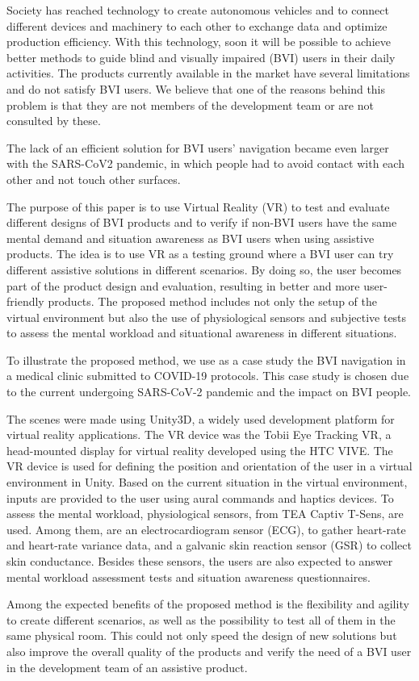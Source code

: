 
Society has reached technology to create autonomous vehicles and to connect different devices and machinery to each other to exchange data and optimize production efficiency.  With this technology, soon it will be possible to achieve better methods to guide blind and visually impaired (BVI) users in their daily activities. The products currently available in the market have several limitations and do not satisfy BVI users. We believe that one of the reasons behind this problem is that they are not members of the development team or are not consulted by these. 

The lack of an efficient solution for BVI users' navigation became even larger with the SARS-CoV2 pandemic, in which people had to avoid contact with each other and not touch other surfaces.

The purpose of this paper is to use Virtual Reality (VR) to test and evaluate different designs of BVI products and to verify if non-BVI users have the same mental demand and situation awareness as BVI users when using assistive products. The idea is to use VR as a testing ground where a BVI user can try different assistive solutions in different scenarios. By doing so, the user becomes part of the product design and evaluation, resulting in better and more user-friendly products. The proposed method includes not only the setup of the virtual environment but also the use of physiological sensors and subjective tests to assess the mental workload and situational awareness in different situations.

To illustrate the proposed method, we use as a case study the BVI navigation in a medical clinic submitted to COVID-19 protocols. This case study is chosen due to the current undergoing SARS-CoV-2 pandemic and the impact on BVI people.

The scenes were made using Unity3D, a widely used development platform for virtual reality applications. The VR device was the Tobii Eye Tracking VR, a head-mounted display for virtual reality developed using the HTC VIVE. The VR device is used for defining the position and orientation of the user in a virtual environment in Unity. Based on the current situation in the virtual environment, inputs are provided to the user using aural commands and haptics devices. To assess the mental workload, physiological sensors, from TEA Captiv T-Sens, are used. Among them, are an electrocardiogram sensor (ECG), to gather heart-rate and heart-rate variance data, and a galvanic skin reaction sensor (GSR) to collect skin conductance. Besides these sensors, the users are also expected to answer mental workload assessment tests and situation awareness questionnaires.

Among the expected benefits of the proposed method is the flexibility and agility to create different scenarios, as well as the possibility to test all of them in the same physical room. This could not only speed the design of new solutions but also improve the overall quality of the products and verify the need of a BVI user in the development team of an assistive product.